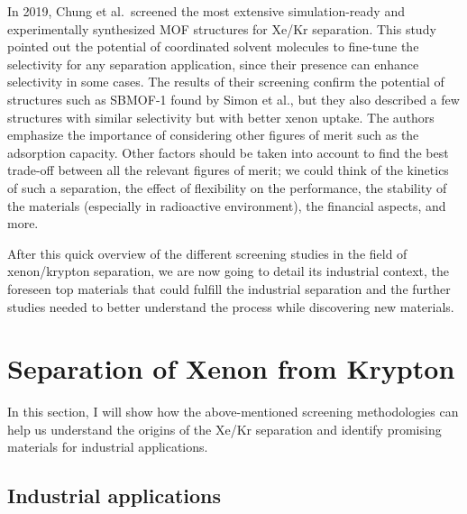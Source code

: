 \documentclass[main.tex]{subfiles}
\begin{document}
In 2019, Chung et al.\ screened the most extensive simulation-ready and experimentally synthesized MOF structures for Xe/Kr separation.\autocite{Chung_2019} This study pointed out the potential of coordinated solvent molecules to fine-tune the selectivity for any separation application, since their presence can enhance selectivity in some cases. The results of their screening confirm the potential of structures such as SBMOF-1 found by Simon et al., but they also described a few structures with similar selectivity but with better xenon uptake. The authors emphasize the importance of considering other figures of merit such as the adsorption capacity. Other factors should be taken into account to find the best trade-off between all the relevant figures of merit; we could think of the kinetics of such a separation, the effect of flexibility on the performance, the stability of the materials (especially in radioactive environment), the financial aspects, and more.

After this quick overview of the different screening studies in the field of xenon/krypton separation, we are now going to detail its industrial context, the foreseen top materials that could fulfill the industrial separation and the further studies needed to better understand the process while discovering new materials.


\section{Separation of Xenon from Krypton}

In this section, I will show how the above-mentioned screening methodologies can help us understand the origins of the Xe/Kr separation and identify promising materials for industrial applications. 

\subsection{Industrial applications}\label{sct:industrial}
\end{document}
